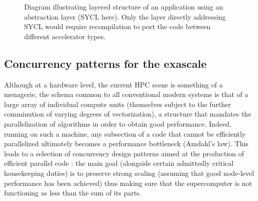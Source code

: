 \begin{figure}
\centerline{}
\caption{\label{fig:sycllayer}
Diagram illustrating layered structure of an application using an abstraction layer (SYCL here).  Only the layer directly addressing SYCL would require recompilation to port the code between different accelerator types.}
\end{figure}
\clearpage
\subsection{Concurrency patterns for the exascale}

Although at a hardware level, the current HPC scene is something of a
menagerie, the schema common to all conventional modern systems is that of a
large array of individual compute units (themselves subject to the further
comminution of varying degrees of vectorization), a structure that mandates the
parallelization of algorithms in order to obtain good performance.  
Indeed, running on such a machine, any subsection of a code that cannot be
efficiently parallelized ultimately becomes a performance bottleneck (Amdahl's
law).  
This leads to a selection of concurrency design patterns aimed at the
production of efficient parallel code \cite{softwarepatternwiki}: the main
goal (alongside certain admittedly critical housekeeping duties) is to
preserve strong scaling (assuming that good node-level performance has been
achieved) thus making sure that the supercomputer is not functioning as less
than the sum of its parts.

